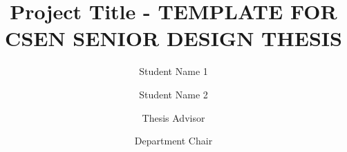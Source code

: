 \documentclass{scu-thesis}
\author{Student Name 1}
\author{Student Name 2}
\title{Project Title - TEMPLATE FOR CSEN SENIOR DESIGN THESIS}
\begin{document}
\frontmatter
\signature{Thesis Advisor}


\signature{Department Chair}

\maketitle


\tableofcontents
\listoffigures

\mainmatter













\backmatter
\end{document}
